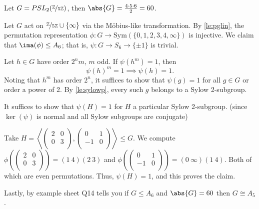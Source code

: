 \begin{example}
    Let \(G = PSL_2(\nicefrac{\mathbb{\MakeUppercase{Z}} }{5\mathbb{\MakeUppercase{Z}} })\), then \(\abs{G} = \frac{4\cdot 5 \cdot 6}{2} = 60\).

    Let \(G\) act on \(\nicefrac{\mathbb{\MakeUppercase{Z}} }{5\mathbb{\MakeUppercase{Z}}}\cup \{\infty\}\) via the Möbius-like transformation. By \eqref{le:pglin}, the permutation representation \(\phi: G \to \mathrm{Sym}(\{0,1,2,3,4,\infty\})\) is injective. We claim that \(\ima(\phi)\leq A_6\); that is, \(\psi:G \to S_6\to \{\pm 1\}\) is trivial.

    Let \(h \in G\) have order \(2^n m\), \(m\) odd. If \(\psi(h^m) = 1\), then \[\psi(h)^m = 1 \implies \psi(h) = 1.\] Noting that \(h^m\) has order \(2^n\), it suffices to show that \(\psi(g) = 1\) for all \(g \in G\) or order a power of 2. By \cref{le:sylowp}, every such \(g\) belongs to a Sylow 2-subgroup.

    It suffices to show that \(\psi(H) = 1\) for \(H\) a particular Sylow 2-subgroup. (since \(\ker(\psi)\) is normal and all Sylow subgroups are conjugate)

    Take \(H = \left\langle \begin{pmatrix}
        2 &  0 \\
        0 &  3 \\
    \end{pmatrix},\begin{pmatrix}
        0 &  1 \\
        -1 &  0 \\
    \end{pmatrix}\right\rangle\leq G\). We compute
    \(\phi\left(\begin{pmatrix}
        2 &  0 \\
        0 &  3 \\
    \end{pmatrix}\right)=(1~4)(2~3)\)
     and 
    \(\phi\left(\begin{pmatrix}
        0 &  1 \\
        -1 &  0 \\
    \end{pmatrix}\right)=(0~\infty)(1~4)\). Both of which are even permutations. Thus, \(\psi(H) = 1\), and this proves the claim.

    Lastly, by example sheet Q14 tells you if \(G \leq A_6\) and \(\abs{G} = 60\) then \(G \cong A_5\).
\end{example}

